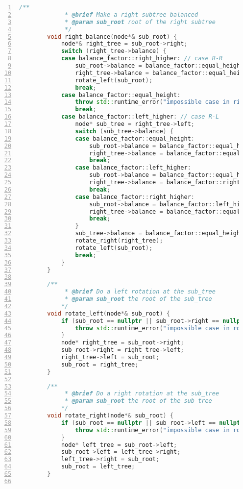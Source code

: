 \documentclass{article}
\begin{document}
\begin{lstlisting}[xleftmargin = 2em,xrightmargin = 2em, aboveskip = 0.5em, numbers = left, language = C++]
        /**
    		 * @brief Make a right subtree balanced
    		 * @param sub_root root of the right subtree
    		 */
        void right_balance(node*& sub_root) {
            node*& right_tree = sub_root->right;
            switch (right_tree->balance) {
            case balance_factor::right_higher: // case R-R
                sub_root->balance = balance_factor::equal_height;
                right_tree->balance = balance_factor::equal_height;
                rotate_left(sub_root);
                break;
            case balance_factor::equal_height:
                throw std::runtime_error("impossible case in right_balance");
                break;
            case balance_factor::left_higher: // case R-L
                node* sub_tree = right_tree->left;
                switch (sub_tree->balance) {
                case balance_factor::equal_height:
                    sub_root->balance = balance_factor::equal_height;
                    right_tree->balance = balance_factor::equal_height;
                    break;
                case balance_factor::left_higher:
                    sub_root->balance = balance_factor::equal_height;
                    right_tree->balance = balance_factor::right_higher;
                    break;
                case balance_factor::right_higher:
                    sub_root->balance = balance_factor::left_higher;
                    right_tree->balance = balance_factor::equal_height;
                    break;
                }
                sub_tree->balance = balance_factor::equal_height;
                rotate_right(right_tree);
                rotate_left(sub_root);
                break;
            }
        }

        /**
    		 * @brief Do a left rotation at the sub_tree
    		 * @param sub_root the root of the sub_tree
    		*/
        void rotate_left(node*& sub_root) {
            if (sub_root == nullptr || sub_root->right == nullptr) {
                throw std::runtime_error("impossible case in rotate_left");
            }
            node* right_tree = sub_root->right;
            sub_root->right = right_tree->left;
            right_tree->left = sub_root;
            sub_root = right_tree;
        }

        /**
    		 * @brief Do a right rotation at the sub_tree
    		 * @param sub_root the root of the sub_tree
    		*/
        void rotate_right(node*& sub_root) {
            if (sub_root == nullptr || sub_root->left == nullptr) {
                throw std::runtime_error("impossible case in rotate_right");
            }
            node* left_tree = sub_root->left;
            sub_root->left = left_tree->right;
            left_tree->right = sub_root;
            sub_root = left_tree;
        }


\end{lstlisting}
\end{document}

